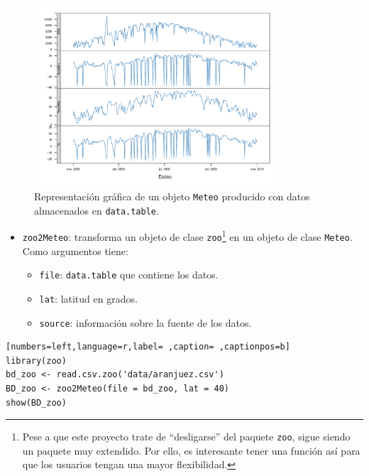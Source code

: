 \begin{figure}[!htb]
\centering
\includegraphics[width=0.8\textwidth]{figuras/codigo-dt2meteo.pdf}
\caption{Representación gráfica de un objeto \texttt{Meteo} producido con datos almacenados en \texttt{data.table}.}
\end{figure}
\FloatBarrier
\begin{itemize}
\item \texttt{zoo2Meteo}: transforma un objeto de clase \texttt{zoo}\footnote{Pese a que este proyecto trate de ``desligarse'' del paquete \texttt{zoo}, sigue siendo un paquete muy extendido. Por ello, es interesante tener una función así para que los usuarios tengan una mayor flexibilidad.} en un objeto de clase \texttt{Meteo}.
Como argumentos tiene:
\begin{itemize}
\item \texttt{file}: \texttt{data.table} que contiene los datos.
\item \texttt{lat}: latitud en grados.
\item \texttt{source}: información sobre la fuente de los datos.
\end{itemize}
\end{itemize}
\begin{lstlisting}[numbers=left,language=r,label= ,caption= ,captionpos=b]
library(zoo)
bd_zoo <- read.csv.zoo('data/aranjuez.csv')
BD_zoo <- zoo2Meteo(file = bd_zoo, lat = 40)
show(BD_zoo)
\end{lstlisting}

